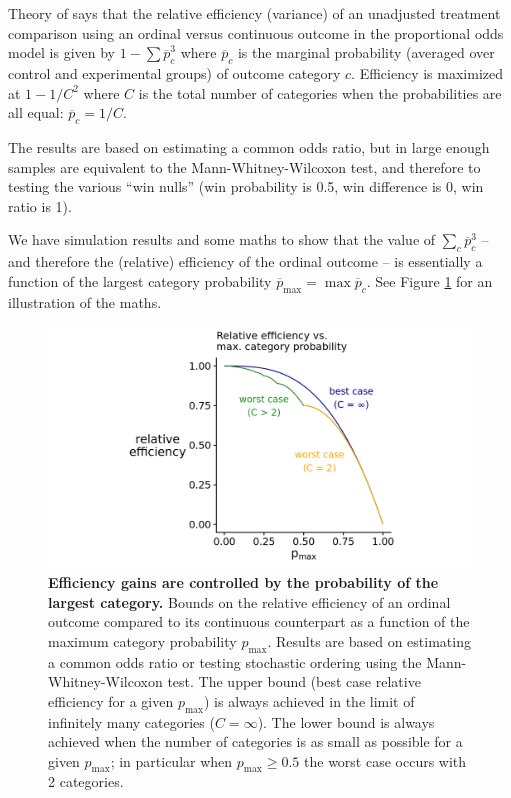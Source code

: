 \documentclass[
  11pt,
  fleqn
]{article}
\begin{document}
Theory of \citep{whiteheadSampleSizeCalculations1993} says that the relative
efficiency (variance) of an unadjusted treatment comparison using an ordinal
versus continuous outcome in the proportional odds model is given
by $1 - \sum
\overline p_c^3$ where $\overline p_c$ is the marginal probability (averaged
over control and experimental groups) of outcome category $c$.
Efficiency is maximized at $1 - 1/C^2$ where $C$ is the total number of
categories when the probabilities are all equal: $\overline p_c = 1/C$.

The results are based on estimating a common odds ratio, but in large
enough samples are equivalent to the Mann-Whitney-Wilcoxon test, and
therefore to testing the various ``win nulls'' (win probability is
  0.5, win difference
is 0, win ratio is 1).

We have simulation results and some maths to show that the value of $\sum_c
\overline p_c^3$ -- and therefore the (relative) efficiency of the
ordinal outcome -- is essentially a function of the largest category
probability $\overline{p}_{\max} = \max \overline{p}_c$. See Figure
\ref{fig:p_max} for an illustration of the maths.

\begin{figure}
  \includegraphics[width=6in]{p_max_controls_efficiency.png}
  \caption{\textbf{Efficiency gains are controlled by the probability
    of the largest category.} Bounds on the relative efficiency of an
    ordinal outcome
    compared to its continuous counterpart as a function of the maximum
    category probability $p_\text{max}$. Results are based on
    estimating a common odds ratio or testing stochastic ordering
    using the Mann-Whitney-Wilcoxon test. The upper bound (best case
    relative efficiency for a given $p_\text{max}$) is always
    achieved in the
    limit of infinitely many categories ($C = \infty$). The lower bound
    is always achieved when the number of categories is as small as
    possible for a given $p_\text{max}$; in particular when
  $p_\text{max} \geq 0.5$ the worst case occurs with 2 categories.}
  \label{fig:p_max}
\end{figure}
\end{document}
